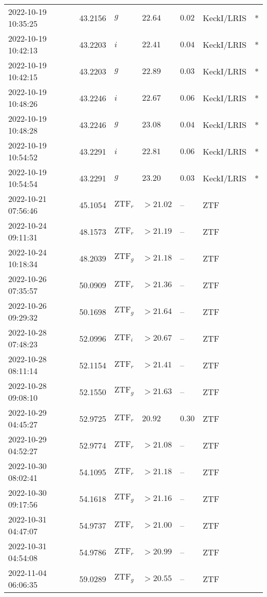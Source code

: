 \documentclass{nature_plusfigure}
\begin{document}
\begin{supplement}
\begin{center}
\begin{longtable}{lllllll}
2022-10-19 10:35:25 & 43.2156 & $g$ & $22.64$ & $0.02$ & KeckI/LRIS & * \\ 
2022-10-19 10:42:13 & 43.2203 & $i$ & $22.41$ & $0.04$ & KeckI/LRIS & * \\ 
2022-10-19 10:42:15 & 43.2203 & $g$ & $22.89$ & $0.03$ & KeckI/LRIS & * \\ 
2022-10-19 10:48:26 & 43.2246 & $i$ & $22.67$ & $0.06$ & KeckI/LRIS & * \\ 
2022-10-19 10:48:28 & 43.2246 & $g$ & $23.08$ & $0.04$ & KeckI/LRIS & * \\ 
2022-10-19 10:54:52 & 43.2291 & $i$ & $22.81$ & $0.06$ & KeckI/LRIS & * \\ 
2022-10-19 10:54:54 & 43.2291 & $g$ & $23.20$ & $0.03$ & KeckI/LRIS & * \\ 
2022-10-21 07:56:46 & 45.1054 & $\mathrm{ZTF}_{r}$ & $>21.02$ & -- & ZTF &  \\ 
2022-10-24 09:11:31 & 48.1573 & $\mathrm{ZTF}_{r}$ & $>21.19$ & -- & ZTF &  \\ 
2022-10-24 10:18:34 & 48.2039 & $\mathrm{ZTF}_{g}$ & $>21.18$ & -- & ZTF &  \\ 
2022-10-26 07:35:57 & 50.0909 & $\mathrm{ZTF}_{r}$ & $>21.36$ & -- & ZTF &  \\ 
2022-10-26 09:29:32 & 50.1698 & $\mathrm{ZTF}_{g}$ & $>21.64$ & -- & ZTF &  \\ 
2022-10-28 07:48:23 & 52.0996 & $\mathrm{ZTF}_{i}$ & $>20.67$ & -- & ZTF &  \\ 
2022-10-28 08:11:14 & 52.1154 & $\mathrm{ZTF}_{r}$ & $>21.41$ & -- & ZTF &  \\ 
2022-10-28 09:08:10 & 52.1550 & $\mathrm{ZTF}_{g}$ & $>21.63$ & -- & ZTF &  \\ 
2022-10-29 04:45:27 & 52.9725 & $\mathrm{ZTF}_{r}$ & $20.92$ & $0.30$ & ZTF &  \\ 
2022-10-29 04:52:27 & 52.9774 & $\mathrm{ZTF}_{r}$ & $>21.08$ & -- & ZTF &  \\ 
2022-10-30 08:02:41 & 54.1095 & $\mathrm{ZTF}_{r}$ & $>21.18$ & -- & ZTF &  \\ 
2022-10-30 09:17:56 & 54.1618 & $\mathrm{ZTF}_{g}$ & $>21.16$ & -- & ZTF &  \\ 
2022-10-31 04:47:07 & 54.9737 & $\mathrm{ZTF}_{r}$ & $>21.00$ & -- & ZTF &  \\ 
2022-10-31 04:54:08 & 54.9786 & $\mathrm{ZTF}_{r}$ & $>20.99$ & -- & ZTF &  \\ 
2022-11-04 06:06:35 & 59.0289 & $\mathrm{ZTF}_{g}$ & $>20.55$ & -- & ZTF &  \\ 

\end{longtable}
\end{center}
\end{supplement}
\end{document}
